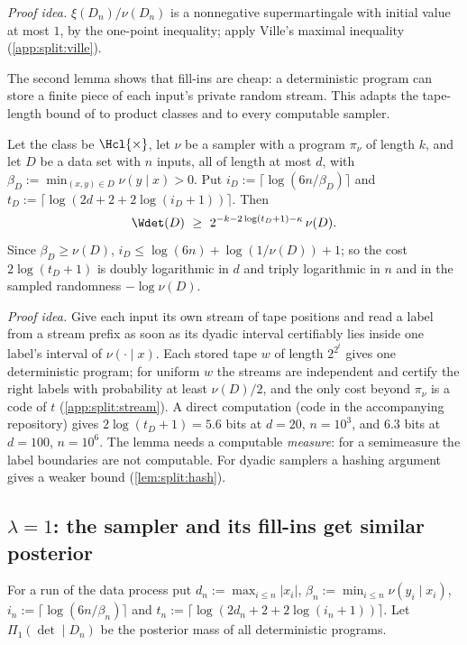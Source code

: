 \emph{Proof idea.} $\xi(D_n)/\nu(D_n)$ is a nonnegative supermartingale with initial value at most $1$, by the one-point inequality; apply Ville's maximal inequality \citep{ville1939etude} (\cref{app:split:ville}).

The second lemma shows that fill-ins are cheap: a deterministic program can store a finite piece of each input's private random stream. This adapts the tape-length bound of \citet{claudeSFI2026fundamentals} to product classes and to every computable sampler.

\begin{lemma}\label{lem:split:stream}
Let the class be $\Hcl{\times}$, let $\nu$ be a sampler with a program $\pi_\nu$ of length $k$, and let $D$ be a data set with $n$ inputs, all of length at most $d$, with $\beta_D:=\min_{(x,y)\in D}\nu(y\mid x)>0$. Put $i_D:=\lceil\log(6n/\beta_D)\rceil$ and $t_D:=\lceil\log(2d+2+2\log(i_D+1))\rceil$. Then
\[
\Wdet(D)\ \ge\ 2^{-k-2\log(t_D+1)-\kappa}\,\nu(D).
\]
Since $\beta_D\ge\nu(D)$, $i_D\le\log(6n)+\log(1/\nu(D))+1$; so the cost $2\log(t_D+1)$ is doubly logarithmic in $d$ and triply logarithmic in $n$ and in the sampled randomness $-\log\nu(D)$.
\end{lemma}

\emph{Proof idea.} Give each input its own stream of tape positions and read a label from a stream prefix as soon as its dyadic interval certifiably lies inside one label's interval of $\nu(\cdot\mid x)$. Each stored tape $w$ of length $2^{2^t}$ gives one deterministic program; for uniform $w$ the streams are independent and certify the right labels with probability at least $\nu(D)/2$, and the only cost beyond $\pi_\nu$ is a code of $t$ (\cref{app:split:stream}). A direct computation (code in the accompanying repository) gives $2\log(t_D+1)=5.6$ bits at $d=20$, $n=10^3$, and $6.3$ bits at $d=100$, $n=10^6$. The lemma needs a computable \emph{measure}: for a semimeasure the label boundaries are not computable. For dyadic samplers a hashing argument gives a weaker bound (\cref{lem:split:hash}).

\subsection{$\lambda=1$: the sampler and its fill-ins get similar posterior}\label{sec:split:lambda1}

For a run of the data process put $d_n:=\max_{i\le n}|x_i|$, $\beta_n:=\min_{i\le n}\nu(y_i\mid x_i)$, $i_n:=\lceil\log(6n/\beta_n)\rceil$ and $t_n:=\lceil\log(2d_n+2+2\log(i_n+1))\rceil$. Let $\Pi_1(\det\mid D_n)$ be the posterior mass of all deterministic programs.

